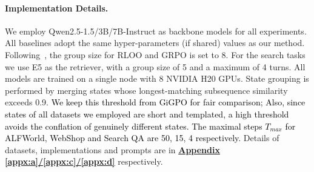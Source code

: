 \documentclass[11pt]{article}
\begin{document}
\paragraph{Implementation Details.}
We employ Qwen2.5-1.5/3B/7B-Instruct as backbone models for all experiments. All baselines adopt the same hyper-parameters (if shared) values as our method. Following~\cite{feng2025group}, the group size for RLOO and GRPO is set to 8. For the search tasks we use E5 as the retriever, with a group size of 5 and a maximum of 4 turns. All models are trained on a single node with 8 NVIDIA H20 GPUs. State grouping is performed by merging states whose longest-matching subsequence similarity exceeds 0.9. \textcolor{black}{We keep this threshold from GiGPO for fair comparison; Also, since states of all datasets we employed are short and templated, a high threshold  avoids the conflation of genuinely different states. The maximal steps $T_{max}$ for ALFWorld, WebShop and Search QA are 50, 15, 4 respectively.} Details of datasets, implementations and prompts are in \textbf{\underline{Appendix \ref{appx:a}/\ref{appx:c}/\ref{appx:d}}} respectively.


\begin{table}[t]
\begin{center} 
\vspace{-0.2cm}
\renewcommand{\arraystretch}{1}   
\setlength\tabcolsep{11pt} 
\vspace{-0.2cm}
\caption{Comparison on search-augmented QA tasks. Role-Agent is trained on NQ and HotpotQA. $\dagger$ and $*$ indicate in-domain and out-of-domain datasets, respectively. All methods are experimented with Qwen2.5-3B-Instruct.}\label{tab:2} 
\vspace{-0.6cm}
\end{center}
\end{table}
\end{document}
